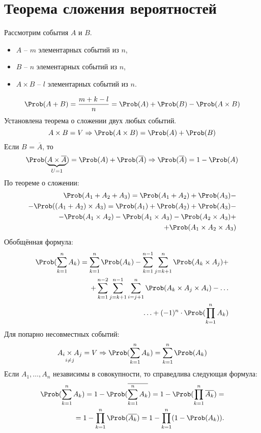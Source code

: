 \section{Теорема сложения вероятностей}
Рассмотрим события $A$ и $B$.
\begin{itemize}
	\item $A$ -- $m$ элементарных событий из $n$,
	\item $B$ -- $n$ элементарных событий из $n$,
	\item $A \times B$ -- $l$ элементарных событий из $n$.
\end{itemize}
\[
	\Prob(A + B) = \frac{m + k - l}{n} = \Prob(A) + \Prob(B) - \Prob(A \times B)
\]
Установлена теорема о сложении двух любых событий.
\[
	A \times B = V \Rightarrow \Prob(A \times B) = \Prob(A) + \Prob(B)
\]
Если $B$ = $\overline{A}$, то
\[
	\Prob(\underbrace{A \times \overline{A}}_{U = 1}) = \Prob(A) + \Prob(\overline{A}) \Rightarrow \Prob(\overline{A}) = 1 - \Prob(A)
\]
По теореме о сложении:
\[
	\begin{split}
		\Prob(A_1 + A_2 + A_3) = \Prob(A_1 + A_2) + \Prob(A_3) - \\
		- \Prob((A_1 + A_2) \times A_3) = \Prob(A_1) + \Prob(A_2) + \Prob(A_3) - \\
		- \Prob(A_1 \times A_2) - \Prob(A_1 \times A_3) - \Prob(A_2 \times A_3) + \\
		+ \Prob(A_1 \times A_2 \times A_3)
	\end{split}
\]
Обобщённая формула:
\[
	\begin{split}
		\Prob(\sum\limits_{k=1}^n A_k) = \sum\limits_{k=1}^n \Prob(A_k) - \sum\limits_{k=1}^{n-1} \sum\limits_{j=k+1}^n \Prob(A_k \times A_j) + \\
		+ \sum\limits_{k=1}^{n-2} \sum\limits_{j=k+1}^{n-1} \sum\limits_{i=j+1}^n \Prob(A_k \times A_j \times A_i) - \ldots \\ \ldots + (-1)^n \cdot \Prob(\prod\limits_{k=1}^n A_k)
	\end{split}
\]
Для попарно несовместных событий:
\[
	\underset{i \not= j}{A_i \times A_j} = V \Rightarrow \Prob(\sum\limits_{k=1}^n A_k) = \sum\limits_{k=1}^n \Prob(A_k)
\]
Если $A_1, \dots, A_n$ независимы в совокупности, то справедлива следующая формула:
\[
	\begin{split}
		\Prob(\sum\limits_{k=1}^n A_k) = 1 - \Prob(\overline{\sum\limits_{k=1}^n A_k}) = 1 - \Prob(\prod\limits_{k=1}^n \overline{A_k}) = \\
		= 1 - \prod\limits_{k=1}^n \Prob(\overline{A_k}) = 1 - \prod\limits_{k=1}^n(1 - \Prob(A_k)).
	\end{split}
\]
